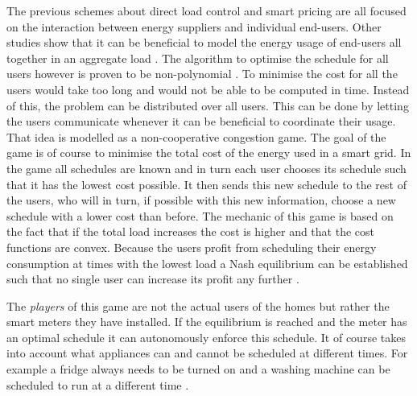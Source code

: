 The previous schemes about direct load control and smart pricing are all focused on the interaction between energy suppliers and individual end-users. Other studies show that it can be beneficial to model the energy usage of end-users all together in an aggregate load \cite{Mohsenian-RadWongJatskevichEtAl2010a, SalinasLiLi2013, ZhuTangLambotharanEtAl2011}. The algorithm to optimise the schedule for all users however is proven to be non-polynomial \cite{CaronKesidis2010}. To minimise the cost for all the users would take too long and would not be able to be computed in time. Instead of this, the problem can be distributed over all users. This can be done by letting the users communicate whenever it can be beneficial to coordinate their usage. That idea is modelled as a non-cooperative congestion game. The goal of the game is of course to minimise the total cost of the energy used in a smart grid. In the game all schedules are known and in turn each user chooses its schedule such that it has the lowest cost possible. It then sends this new schedule to the rest of the users, who will in turn, if possible with this new information, choose a new schedule with a lower cost than before. The mechanic of this game is based on the fact that if the total load increases the cost is higher and that the cost functions are convex. Because the users profit from scheduling their energy consumption at times with the lowest load a Nash equilibrium can be established such that no single user can increase its profit any further \cite{Mohsenian-RadWongJatskevichEtAl2010a, ZhuTangLambotharanEtAl2011, IbarsNavarroGiupponi2010}.

The \emph{players} of this game are not the actual users of the homes but rather the smart meters they have installed. If the equilibrium is reached and the meter has an optimal schedule it can autonomously enforce this schedule. It of course takes into account what appliances can and cannot be scheduled at different times. For example a fridge always needs to be turned on and a washing machine can be scheduled to run at a different time \cite{DepuruWangDevabhaktuni2011a}. 

